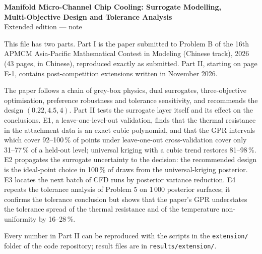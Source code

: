 
\graphicspath{{../../figures/extension/}}

\thispagestyle{empty}
\begin{center}
{\Large\bfseries Manifold Micro-Channel Chip Cooling: Surrogate Modelling,\\[0.2em] Multi-Objective Design and Tolerance Analysis}\\[0.7em]
{\large Extended edition --- note}
\end{center}
\vspace{0.8em}

This file has two parts. Part I is the paper submitted to Problem B of the 16th APMCM Asia-Pacific Mathematical Contest in Modeling (Chinese track), 2026 (43 pages, in Chinese), reproduced exactly as submitted. Part II, starting on page E-1, contains post-competition extensions written in November 2026.

The paper follows a chain of grey-box physics, dual surrogates, three-objective optimisation, preference robustness and tolerance sensitivity, and recommends the design $(0.22, 4.5, 4)$. Part II tests the surrogate layer itself and its effect on the conclusions. E1, a leave-one-level-out validation, finds that the thermal resistance in the attachment data is an exact cubic polynomial, and that the GPR intervals which cover 92--100\,\% of points under leave-one-out cross-validation cover only 31--77\,\% of a held-out level; universal kriging with a cubic trend restores 81--98\,\%. E2 propagates the surrogate uncertainty to the decision: the recommended design is the ideal-point choice in 100\,\% of draws from the universal-kriging posterior. E3 locates the next batch of CFD runs by posterior variance reduction. E4 repeats the tolerance analysis of Problem 5 on 1\,000 posterior surfaces; it confirms the tolerance conclusion but shows that the paper's GPR understates the tolerance spread of the thermal resistance and of the temperature non-uniformity by 16--28\,\%.

Every number in Part II can be reproduced with the scripts in the \texttt{extension/} folder of the code repository; result files are in \texttt{results/extension/}.

